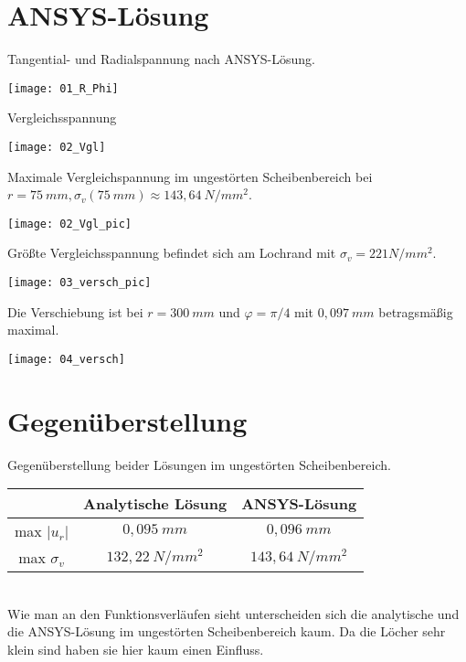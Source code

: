 \documentclass[]{article}
\begin{document}
\section{ANSYS-L\"osung}
Tangential- und Radialspannung nach ANSYS-L\"osung.\\
\begin{center}
\texttt{[image: 01\_R\_Phi]}
\end{center}
Vergleichsspannung
\begin{center}
\texttt{[image: 02\_Vgl]}
\end{center}
Maximale Vergleichspannung im ungest\"orten Scheibenbereich bei $r=75\ mm, \sigma_v(75\ mm)\approx 143,64\ N/mm^2$.\\
\begin{center}
\texttt{[image: 02\_Vgl\_pic]}
\end{center}
Größte Vergleichsspannung befindet sich am Lochrand mit $\sigma_v=221 N/mm^2$.
\begin{center}
\texttt{[image: 03\_versch\_pic]}
\end{center}
Die Verschiebung ist bei $r=300\ mm$ und $\varphi=\pi/4$ mit $0,097\ mm$ betragsm\"aßig maximal.
\begin{center}
\texttt{[image: 04\_versch]}
\end{center}
\section{Gegen\"uberstellung}
Gegen\"uberstellung beider L\"osungen im ungest\"orten Scheibenbereich.\vspace{0.5cm}\\
\begin{tabular}{c|cc}
& Analytische L\"osung& ANSYS-L\"osung\\ \hline
max $|u_r|$ & $0,095\ mm$& $0,096\ mm$\\
max $\sigma_v$ & $132,22\ N/mm^2$ & $143,64\ N/mm^2$
\end{tabular}\vspace{0.5cm}\\
Wie man an den Funktionsverl\"aufen sieht unterscheiden sich die analytische und die ANSYS-L\"osung im ungest\"orten Scheibenbereich kaum. Da die L\"ocher sehr klein sind haben sie hier kaum einen Einfluss.
\end{document}
